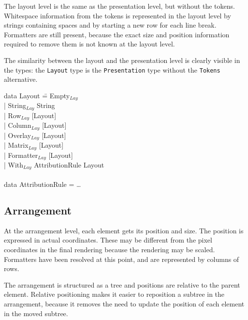 The layout level is the same as the presentation level, but without the tokens. Whitespace information from the tokens is represented in the layout level by strings containing spaces and by starting a new row for each line break. Formatters are still present, because the exact size and position information required to remove them is not known at the layout level.

The similarity between the layout and the presentation level is clearly visible in the types: the {\tt Layout} type is the {\tt Presentation} type without the {\tt Tokens} alternative.

\noindent
\ttfamily
\begin{tabbing}
data Layout \= = Empty$_{Lay}$\\
            \> | String$_{Lay}$ String \\
            \> | Row$_{Lay}$ [Layout]\\
            \> | Column$_{Lay}$ [Layout]\\
            \> | Overlay$_{Lay}$ [Layout]\\
            \> | Matrix$_{Lay}$ [Layout]\\
            \> | Formatter$_{Lay}$ [Layout]\\
            \> | With$_{Lay}$ AttributionRule Layout\\
\\
data AttributionRule = \dots\\
\end{tabbing}
\rmfamily

\subsection{Arrangement}

At the arrangement level, each element gets its position and size. The position is expressed in actual coordinates. These may be different from the pixel coordinates in the final rendering because the rendering may be scaled. Formatters have been resolved at this point, and are represented by columns of rows.


The arrangement is structured as a tree and positions are relative to the parent element. Relative positioning makes it easier to reposition a subtree in the arrangement, because it removes the need to update the position of each element in the moved subtree.


